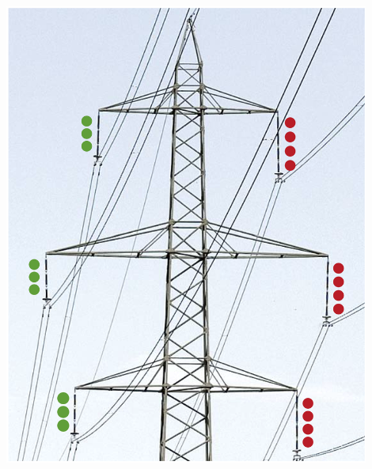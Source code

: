 \begin{minipage}[c]{0.48\columnwidth}
    \begin{center}
        \includegraphics[width=0.9\textwidth, align=c]{images/Freileitungen_1.png}
    \end{center}
\end{minipage}
\hfill
